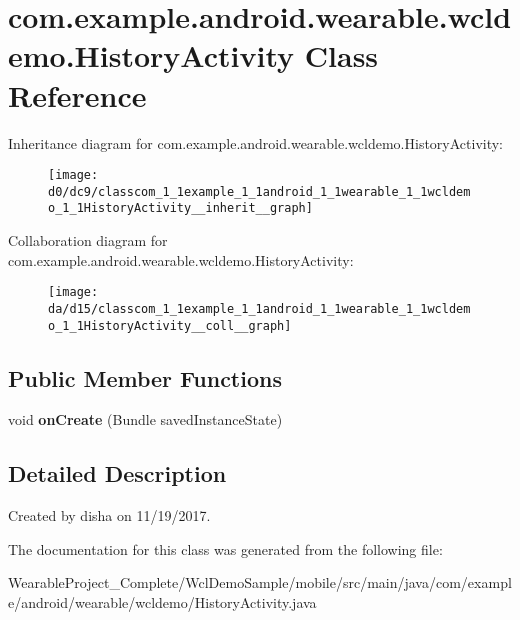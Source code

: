 \hypertarget{classcom_1_1example_1_1android_1_1wearable_1_1wcldemo_1_1HistoryActivity}{}\section{com.\+example.\+android.\+wearable.\+wcldemo.\+History\+Activity Class Reference}
\label{classcom_1_1example_1_1android_1_1wearable_1_1wcldemo_1_1HistoryActivity}


Inheritance diagram for com.\+example.\+android.\+wearable.\+wcldemo.\+History\+Activity\+:\nopagebreak
\begin{figure}[H]
\begin{center}
\leavevmode
\texttt{[image: d0/dc9/classcom\_1\_1example\_1\_1android\_1\_1wearable\_1\_1wcldemo\_1\_1HistoryActivity\_\_inherit\_\_graph]}
\end{center}
\end{figure}


Collaboration diagram for com.\+example.\+android.\+wearable.\+wcldemo.\+History\+Activity\+:\nopagebreak
\begin{figure}[H]
\begin{center}
\leavevmode
\texttt{[image: da/d15/classcom\_1\_1example\_1\_1android\_1\_1wearable\_1\_1wcldemo\_1\_1HistoryActivity\_\_coll\_\_graph]}
\end{center}
\end{figure}
\subsection*{Public Member Functions}
\begin{DoxyCompactItemize}
\item 
void {\bfseries on\+Create} (Bundle saved\+Instance\+State)\hypertarget{classcom_1_1example_1_1android_1_1wearable_1_1wcldemo_1_1HistoryActivity_aa76f8ef032749cb54e10794e1dbfd147}{}\label{classcom_1_1example_1_1android_1_1wearable_1_1wcldemo_1_1HistoryActivity_aa76f8ef032749cb54e10794e1dbfd147}

\end{DoxyCompactItemize}


\subsection{Detailed Description}
Created by disha on 11/19/2017. 

The documentation for this class was generated from the following file\+:\begin{DoxyCompactItemize}
\item 
Wearable\+Project\+\_\+\+Complete/\+Wcl\+Demo\+Sample/mobile/src/main/java/com/example/android/wearable/wcldemo/History\+Activity.\+java\end{DoxyCompactItemize}

